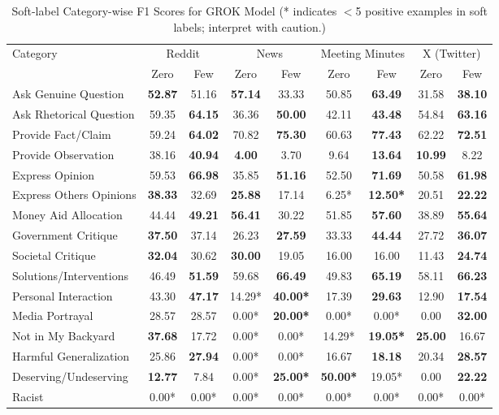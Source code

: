 \begin{table}[htbp]
\centering
\begin{tabular}{l *{8}{c}}
\toprule
Category & \multicolumn{2}{c}{Reddit} & \multicolumn{2}{c}{News} & \multicolumn{2}{c}{Meeting Minutes} & \multicolumn{2}{c}{X (Twitter)} \\
& Zero & Few & Zero & Few & Zero & Few & Zero & Few \\
\midrule
Ask Genuine Question & \textbf{52.87} & 51.16 & \textbf{57.14} & 33.33 & 50.85 & \textbf{63.49} & 31.58 & \textbf{38.10} \\
Ask Rhetorical Question & 59.35 & \textbf{64.15} & 36.36 & \textbf{50.00} & 42.11 & \textbf{43.48} & 54.84 & \textbf{63.16} \\
Provide Fact/Claim & 59.24 & \textbf{64.02} & 70.82 & \textbf{75.30} & 60.63 & \textbf{77.43} & 62.22 & \textbf{72.51} \\
Provide Observation & 38.16 & \textbf{40.94} & \textbf{4.00} & 3.70 & 9.64 & \textbf{13.64} & \textbf{10.99} & 8.22 \\
Express Opinion & 59.53 & \textbf{66.98} & 35.85 & \textbf{51.16} & 52.50 & \textbf{71.69} & 50.58 & \textbf{61.98} \\
Express Others Opinions & \textbf{38.33} & 32.69 & \textbf{25.88} & 17.14 & 6.25* & \textbf{12.50*} & 20.51 & \textbf{22.22} \\
Money Aid Allocation & 44.44 & \textbf{49.21} & \textbf{56.41} & 30.22 & 51.85 & \textbf{57.60} & 38.89 & \textbf{55.64} \\
Government Critique & \textbf{37.50} & 37.14 & 26.23 & \textbf{27.59} & 33.33 & \textbf{44.44} & 27.72 & \textbf{36.07} \\
Societal Critique & \textbf{32.04} & 30.62 & \textbf{30.00} & 19.05 & 16.00 & 16.00 & 11.43 & \textbf{24.74} \\
Solutions/Interventions & 46.49 & \textbf{51.59} & 59.68 & \textbf{66.49} & 49.83 & \textbf{65.19} & 58.11 & \textbf{66.23} \\
Personal Interaction & 43.30 & \textbf{47.17} & 14.29* & \textbf{40.00*} & 17.39 & \textbf{29.63} & 12.90 & \textbf{17.54} \\
Media Portrayal & 28.57 & 28.57 & 0.00* & \textbf{20.00*} & 0.00* & 0.00* & 0.00 & \textbf{32.00} \\
Not in My Backyard & \textbf{37.68} & 17.72 & 0.00* & 0.00* & 14.29* & \textbf{19.05*} & \textbf{25.00} & 16.67 \\
Harmful Generalization & 25.86 & \textbf{27.94} & 0.00* & 0.00* & 16.67 & \textbf{18.18} & 20.34 & \textbf{28.57} \\
Deserving/Undeserving & \textbf{12.77} & 7.84 & 0.00* & \textbf{25.00*} & \textbf{50.00*} & 19.05* & 0.00 & \textbf{22.22} \\
Racist & 0.00* & 0.00* & 0.00* & 0.00* & 0.00* & 0.00* & 0.00* & 0.00* \\
\bottomrule
\end{tabular}
\centering\caption{Soft-label Category-wise F1 Scores for GROK Model (* indicates $<$5 positive examples in soft labels; interpret with caution.)}
\label{tab:grok_category_breakdown}
\end{table}